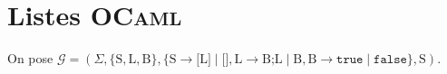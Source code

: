 \section{Listes \textsc{OCaml}}

On pose $\mathcal{G} = (\Sigma, \{\mathrm{S}, \mathrm{L}, \mathrm{B}\}, \{\mathrm{S} \to \texttt{[}\mathrm{L}\texttt{]} \mid \texttt{[]}, \mathrm{L} \to \mathrm{B}\texttt{;}\mathrm{L}  \mid \mathrm{B}, \mathrm{B}\to \texttt{true} \mid \texttt{false}\}, \mathrm{S})$.
